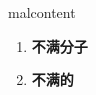 
\begin{frame}
{\huge malcontent}
\begin{center}
\begin{enumerate}\Large
  \item \textbf{不满分子}
  \item \textbf{不满的}
\end{enumerate}
\end{center}
\end{frame}
